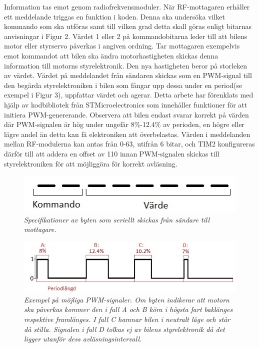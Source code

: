 \documentclass[a4paper]{article}
\begin{document}
\vspace{5mm} \noindent
Information tas emot genom radiofrekvensmoduler. När RF-mottagaren erhåller ett meddelande triggas en funktion i koden. Denna ska undersöka vilket kommando som ska utföras samt till vilken grad detta skall göras enligt bitarnas anvisningar i Figur 2. Värdet 1 eller 2 på kommandobitarna leder till att bilens motor eller styrservo påverkas i angiven ordning. Tar mottagaren exempelvis emot kommandot att bilen ska ändra motorhastigheten skickas denna information till motorns styrelektronik. Den nya hastigheten beror på storleken av värdet. Värdet på meddelandet från sändaren skickas som en PWM-signal till den begärda styrelektroniken i bilen som fångar upp dessa under en period(se exempel i Figur 3), uppfattar värdet och agerar. Detta arbete har förenklats med hjälp av kodbibliotek från STMicroelectronics som innehåller funktioner för att initiera PWM-genererande. Observera att bilen endast svarar korrekt på värden där PWM-signalen är hög under ungefär 8\%-12.4\% av perioden, en högre eller lägre andel än detta kan få elektroniken att överbelastas. Värden i meddelanden mellan RF-modulerna kan antas från 0-63, utifrån 6 bitar, och TIM2 konfigureras därför till att addera en offset av 110 innan PWM-signalen skickas till styrelektroniken för att möjliggöra för korrekt avläsning.



\begin{figure}[H]
\includegraphics[scale=1]{aByteComVal.jpg}
\centering
\caption{\it Specifikationer av byten som seriellt skickas från sändare till mottagare.}
\end{figure} 


\begin{figure}[H]
\includegraphics[scale=1]{PWMsignals.jpg}
\centering
\caption{\it Exempel på möjliga PWM-signaler. Om byten indikerar att motorn ska påverkas kommer den i fall A och B köra i högsta fart baklänges respektive framlänges. I fall C hamnar bilen i neutralt läge och står då stilla. Signalen i fall D tolkas ej av bilens styrelektronik då det ligger utanför dess avläsningsintervall.}
\end{figure} 
\end{document}
